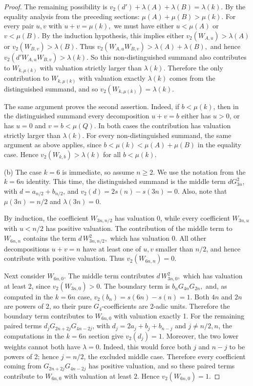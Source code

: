 \documentclass[10pt,a4paper]{amsart}
\begin{document}
\begin{proof}
The remaining possibility is $v_2(d')+\lambda(A)+\lambda(B)=\lambda(k).$
By the equality analysis from the preceding sections: $\mu(A)+\mu(B)>\mu(k).$ For every pair $u,v$ with $u+v=\mu(k),$ we must have either
$ u<\mu(A)$  or $v<\mu(B).$ By the induction hypothesis, this implies either
$v_2(W_{A,u})>\lambda(A)$ or $v_2(W_{B,v})>\lambda(B).$ Thus
$ v_2(W_{A,u}W_{B,v})>\lambda(A)+\lambda(B),$
and hence $v_2(d'W_{A,u}W_{B,v})>\lambda(k).$ So this non-distinguished summand also contributes to $W_{k,\mu(k)}$ with valuation strictly larger than $\lambda(k)$. Therefore the only contribution to $W_{k,\mu(k)}$ with valuation exactly $\lambda(k)$ comes from the distinguished summand, and so $v_2(W_{k,\mu(k)})=\lambda(k).$

The same argument proves the second assertion.  Indeed, if $b<\mu(k)$, then in the distinguished summand every decomposition $u+v=b$ either has $u>0$, or has $u=0$ and $v=b<\mu(Q)$.  In both cases the contribution has valuation strictly larger than $\lambda(k)$.  For every non-distinguished summand, the same argument as above applies, since $ b<\mu(k)<\mu(A)+\mu(B) $ in the equality case.  Hence $v_2(W_{k,b})>\lambda(k) $ for all \(b<\mu(k)\).

\bigskip

(b) The case $k=6$ is immediate, so assume $n\ge 2$. We use the notation from the $k=6n$ identity. This time, the distinguished summand is the middle term $ dG_{3n}^2$, with $d=a_{n/2}+b_{n/2}$, and $v_2(d)=2s(n)-s(3n)=0.$ Also, note that $\mu(3n)=n/2$ and $\lambda(3n)=0.$

By induction, the coefficient $W_{3n,n/2}$ has valuation 0, while every coefficient $W_{3n,u}$ with $u<n/2$ has positive valuation. The contribution of the middle term to $W_{6n,n}$ contains the term $d\,W_{3n,n/2}^2,$ which has valuation 0. All other decompositions $u+v=n$ have at least one of $u,v$ smaller than $n/2$, and hence contribute with positive valuation.  Thus $v_2(W_{6n,n})=0.$

Next consider $W_{6n,0}$.  The middle term contributes $ d\,W_{3n,0}^2,$ which has valuation at least 2, since $v_2(W_{3n,0})>0$.  The boundary term is $b_nG_{4n}G_{2n},$ and, as computed in the $k=6n$ case, $v_2(b_n)=s(6n)-s(n)=1.$ Both $4n$ and $2n$ are powers of 2, so their pure $G_4$-coefficients are 2-adic units.  Therefore the boundary term contributes to $W_{6n,0}$ with valuation exactly 1. For the remaining paired terms $d_jG_{2n+2j}G_{4n-2j}$, with  $d_j=2a_j+b_j+b_{n-j}$ and $j\neq n/2,n$, the computations in the $k=6n$ section give $v_2(d_j)=1.$ Moreover, the two lower weights cannot both have $\lambda=0$.  Indeed, this would force both $j$ and $n-j$ to be powers of 2; hence $j=n/2$, the excluded middle case.  Therefore every coefficient coming from $G_{2n+2j}G_{4n-2j}$ has positive valuation, and so these paired terms contribute to \(W_{6n,0}\) with valuation at least \(2\). Hence $v_2(W_{6n,0})=1.$


\end{proof}
\end{document}
